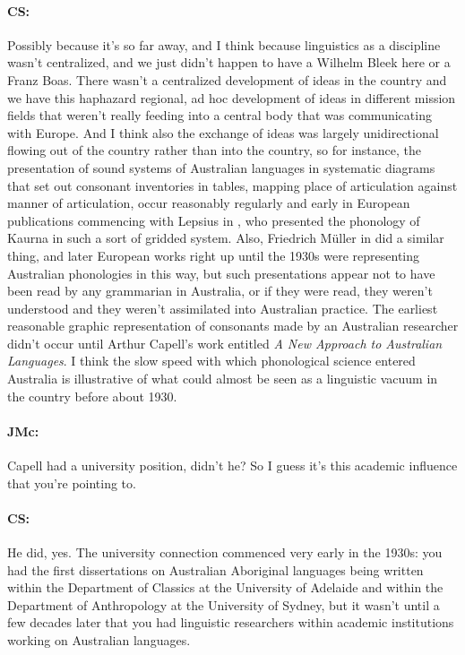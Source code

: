 \documentclass[output=paper]{langscibook}
\begin{document}
\paragraph*{CS:}  Possibly because it’s so far away, and I think because linguistics as a discipline wasn’t centralized, and we just didn’t happen to have a Wilhelm Bleek here or a Franz Boas. There wasn’t a centralized development of ideas in the country and we have this haphazard regional, ad hoc development of ideas in different mission fields that weren’t really feeding into a central body that was communicating with Europe. And I think also the exchange of ideas was largely unidirectional flowing out of the country rather than into the country, so for instance, the presentation of sound systems of Australian languages in systematic diagrams that set out consonant inventories in tables, mapping place of articulation against manner of articulation, occur reasonably regularly and early in European publications commencing with Lepsius in \citeyear{lepsius1855a}, who presented the phonology of Kaurna in such a sort of gridded system. Also, Friedrich Müller in \citeyear{mueller1867a} did a similar thing, and later European works right up until the 1930s were representing Australian phonologies in this way, but such presentations appear not to have been read by any grammarian in Australia, or if they were read, they weren’t understood and they weren’t assimilated into Australian practice. The earliest reasonable graphic representation of consonants made by an Australian researcher didn’t occur until Arthur Capell's \citeyear{Capell1956} work entitled \textit{A New Approach to Australian Languages}. I think the slow speed with which phonological science entered Australia is illustrative of what could almost be seen as a linguistic vacuum in the country before about 1930.


\paragraph*{JMc:}  Capell had a university position, didn’t he? So I guess it’s this academic influence that you’re pointing to.


\paragraph*{CS:}  He did, yes. The university connection commenced very early in the 1930s: you had the first dissertations on Australian Aboriginal languages being written within the Department of Classics at the University of Adelaide and within the Department of Anthropology at the University of Sydney, but it wasn’t until a few decades later that you had linguistic researchers within academic institutions working on Australian languages.
\end{document}

